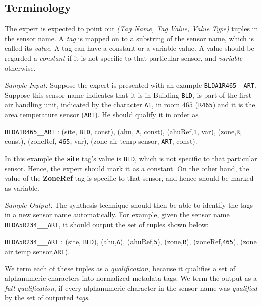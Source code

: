 \subsection{Terminology}

The expert is expected to point out \emph{(Tag Name, Tag Value, Value Type)} tuples in the sensor name. A {\it tag} is mapped on to a substring of the sensor name, which is called its {\it value}. A tag can have a constant or a variable value. A value should be regarded a \emph{constant} if it is not specific to that particular sensor, and \emph{variable} otherwise.

{\it Sample Input:} Suppose the expert is presented with an example \texttt{BLDA1R465\_\_ART}. Suppose this sensor name indicates that it is in Building \texttt{BLD}, is part of the first air handling unit, indicated by the character \texttt{A1}, in room $465$ (\texttt{R465}) and it is the area temperature sensor (\texttt{ART}). He should qualify it in order as

 \texttt{BLDA1R465\_\_ART} : (site, \texttt{BLD}, const), (ahu, \texttt{A}, const), (ahuRef,\texttt{1}, var), (zone,\texttt{R}, const), (zoneRef, \texttt{465}, var), (zone air temp sensor, \texttt{ART}, const). 

In this example the {\bf site} tag's value is \texttt{BLD}, which is not specific to that particular sensor. Hence, the expert should mark it as a constant. On the other hand, the value of the {\bf ZoneRef} tag is specific to that sensor, and hence should be marked as variable.

{\it Sample Output:} The synthesis technique should then be able to identify the tags in a new sensor name automatically. For example, given the sensor name \texttt{BLDA5R234\_\_\_ART}, it should output the set of tuples shown below:

\texttt{BLDA5R234\_\_\_ART} : (site, \texttt{BLD}), (ahu,\texttt{A}), (ahuRef,\texttt{5}), (zone,\texttt{R}), (zoneRef,\texttt{465}), (zone air temp sensor,\texttt{ART}).

We term each of these tuples as a {\it qualification}, because it qualifies a set of alphanumeric characters into normalized metadata tags. We term the output as a {\it full qualification}, if every alphanumeric character in the sensor name was {\it qualified} by the set of outputed {\it tags}.

